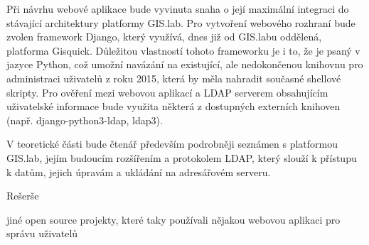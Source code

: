 
Při návrhu webové aplikace bude vyvinuta snaha o její maximální
integraci do stávající architektury platformy GIS.lab. Pro vytvoření
webového rozhraní bude zvolen framework Django, který využívá, dnes již
od GIS.labu oddělená, platforma Gisquick. Důležitou vlastností tohoto
frameworku je i to, že je psaný v jazyce Python, což umožní navázání
na existující, ale nedokončenou knihovnu pro administraci uživatelů z
roku 2015, která by měla nahradit současné shellové skripty. Pro
ověření mezi webovou aplikací a LDAP serverem obsahujícím uživatelské
informace bude využita některá z dostupných externích knihoven
(např. django-python3-ldap, ldap3).

V teoretické části bude čtenář především podrobněji seznámen s
platformou GIS.lab, jejím budoucím rozšířením a protokolem LDAP, který slouží k přístupu k datům, jejich úpravám a ukládání na adresářovém serveru.

Rešerše

jiné open source projekty, které taky používali nějakou webovou aplikaci pro správu uživatelů
